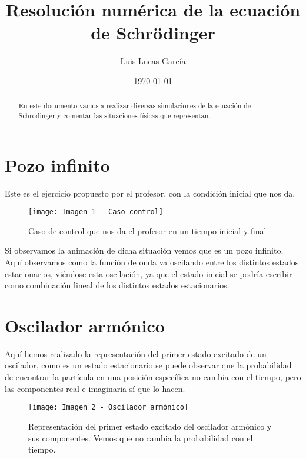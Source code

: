 \documentclass{article} %
\author{Luis Lucas García}
\title{Resolución numérica de la ecuación de Schrödinger}
\date{\today}
\affil{Facultad de ciencias - Universidad de Alicante - Introducción a la modelización en física - Grupo L3 - Grado en física}
\begin{document}
\maketitle
\begin{abstract}
En este documento vamos a realizar diversas simulaciones de la ecuación de Schrödinger y comentar las situaciones físicas que representan.
\end{abstract}
\tableofcontents
\pagebreak

\section{Pozo infinito}

Este es el ejercicio propuesto por el profesor, con la condición inicial que nos da.

\begin{figure}[h!]
\begin{center}
\texttt{[image: Imagen 1 - Caso control]}
\caption{Caso de control que nos da el profesor en un tiempo inicial y final}
\end{center}
\end{figure}

Si observamos la animación de dicha situación vemos que es un pozo infinito. Aquí observamos como la función de onda va oscilando entre los distintos estados estacionarios, viéndose esta oscilación, ya que el estado inicial se podría escribir como combinación lineal de los distintos estados estacionarios.

\section{Oscilador armónico}

Aquí hemos realizado la representación del primer estado excitado  de un oscilador, como es un estado estacionario se puede observar que la probabilidad de encontrar la partícula en una posición específica no cambia con el tiempo, pero las componentes real e imaginaria sí que lo hacen.

\begin{figure}[h!]
\begin{center}
\texttt{[image: Imagen 2 - Oscilador armónico]}
\caption{Representación del primer estado excitado del oscilador armónico y sus componentes. Vemos que no cambia la probabilidad con el tiempo.}
\end{center}
\end{figure}
\end{document}
